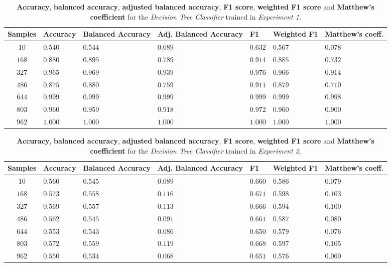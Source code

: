 \documentclass[sigplan,screen]{acmart}
\begin{document}
\begin{table}[h]
  \caption{\textbf{Accuracy}, \textbf{balanced accuracy}, \textbf{adjusted balanced accuracy}, \textbf{F1 score}, \textbf{weighted F1 score} and \textbf{Matthew's coefficient} for the \emph{Decision Tree Classifier} trained in \emph{Experiment 1}.}
  \label{tab:dc_1_table_results}
  \begin{tabular}{cllllll}
    \toprule
    \textbf{Samples}&\textbf{Accuracy}&\textbf{Balanced Accuracy}&\textbf{Adj. Balanced Accuracy}&\textbf{F1}&\textbf{Weighted F1}&\textbf{Matthew's coeff.}\\
    \midrule
    $10$ & $0.540$ & $0.544$ & $0.089$ & $0.632$ & $0.567$ & $0.078$\\
    $168$ & $0.880$ & $0.895$ & $0.789$ & $0.914$ & $0.885$ & $0.732$\\
    $327$ & $0.965$ & $0.969$ & $0.939$ & $0.976$ & $0.966$ & $0.914$\\
    $486$ & $0.875$ & $0.880$ & $0.759$ & $0.911$ & $0.879$ & $0.710$\\
    $644$ & $0.999$ & $0.999$ & $0.999$ & $0.999$ & $0.999$ & $0.998$\\
    $803$ & $0.960$ & $0.959$ & $0.918$ & $0.972$ & $0.960$ & $0.900$\\
    $962$ & $1.000$ & $1.000$ & $1.000$ & $1.000$ & $1.000$ & $1.000$\\
    \bottomrule
    \end{tabular}
\end{table}

\begin{table}[h]
  \caption{\textbf{Accuracy}, \textbf{balanced accuracy}, \textbf{adjusted balanced accuracy}, \textbf{F1 score}, \textbf{weighted F1 score} and \textbf{Matthew's coefficient} for the \emph{Decision Tree Classifier} trained in \emph{Experiment 2}.}
  \label{tab:dc_2_table_results}
  \begin{tabular}{cllllll}
    \toprule
    \textbf{Samples}&\textbf{Accuracy}&\textbf{Balanced Accuracy}&\textbf{Adj. Balanced Accuracy}&\textbf{F1}&\textbf{Weighted F1}&\textbf{Matthew's coeff.}\\
    \midrule
    $10$ & $0.560$ & $0.545$ & $0.089$ & $0.660$ & $0.586$ & $0.079$\\
    $168$ & $0.573$ & $0.558$ & $0.116$ & $0.671$ & $0.598$ & $0.103$\\
    $327$ & $0.569$ & $0.557$ & $0.113$ & $0.666$ & $0.594$ & $0.100$\\
    $486$ & $0.562$ & $0.545$ & $0.091$ & $0.661$ & $0.587$ & $0.080$\\
    $644$ & $0.553$ & $0.543$ & $0.086$ & $0.650$ & $0.579$ & $0.076$\\
    $803$ & $0.572$ & $0.559$ & $0.119$ & $0.668$ & $0.597$ & $0.105$\\
    $962$ & $0.550$ & $0.534$ & $0.068$ & $0.651$ & $0.576$ & $0.060$\\
    \bottomrule
    \end{tabular}
\end{table}
\end{document}

